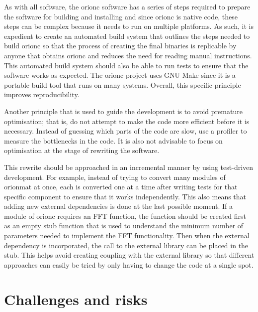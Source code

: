 As with all software, the \gls{orionc} software has a series of
steps required to prepare the software for building and
installing and since \gls{orionc} is native code, these steps can
be complex because it needs to run on multiple platforms. As such,
it is expedient to create an automated build system that outlines
the steps needed to build \gls{orionc} so that the process of
creating the final binaries is replicable by anyone that obtains
\gls{orionc} and reduces the need for reading manual instructions.
This automated build system should also be able to run tests to
ensure that the software works as expected. The \gls{orionc}
project uses GNU Make since it is a portable build tool that runs
on many systems. Overall, this specific principle improves
reproducibility.

Another principle that is used to guide the development is to
avoid premature optimisation; that is, do not attempt to make the
code more efficient before it is necessary. Instead of guessing
which parts of the code are slow, use a profiler to measure the
bottlenecks in the code. It is also not advisable to focus on
optimisation at the stage of rewriting the software.

This rewrite should be approached in an incremental manner by
using test-driven development. For example, instead of trying to convert many
modules of \gls{orionmat} at once, each is converted one at a
time after writing tests for that specific component to ensure
that it works independently. This also means that adding new
external dependencies is done at the last possible moment. If a
module of \gls{orionc} requires an \acrshort{FFT} function,
the function should be created first as an empty stub function
that is used to understand the minimum number of parameters needed
to implement the FFT functionality. Then when the external dependency
is incorporated, the call to the external library can be placed in
the stub. This helps avoid creating coupling with the external
library so that different approaches can easily be tried by only
having to change the code at a single spot.

\section{Challenges and risks}

